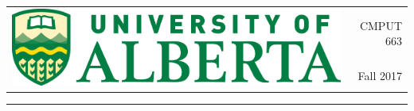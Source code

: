 \documentclass[12pt]{article}
\begin{document}
\begin{tabularx}{\textwidth}{Xr}
\multirow{2}{*}{\includegraphics[scale=0.25]{UA-COLOUR.png}}& \large CMPUT 663\\
&\large Fall 2017\\
\end{tabularx}

\vspace{0.2cm}
{\color{black}\rule{\textwidth}{.25ex}}%
\vspace{0.2cm}
\end{document}
